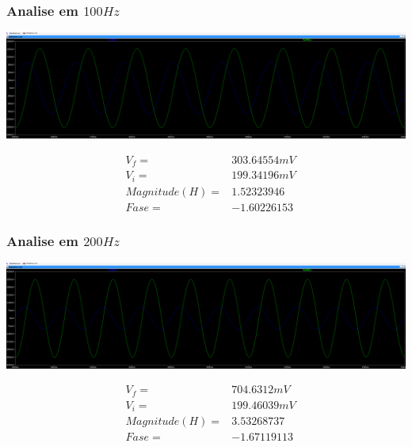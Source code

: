 \documentclass[12pt,twoside, a4paper, twocolumn]{article}
\begin{document}
\subsubsection{Analise em $100Hz$}

\begin{adjustbox}{scale=0.09}
    \includegraphics{ltfreq100.png}
\end{adjustbox}

\begin{equation*}
    \begin{aligned}
         & V_f =          & 303.64554mV \\
         & V_i =          & 199.34196mV \\
         & Magnitude(H) = & 1.52323946  \\
         & Fase =         & -1.60226153
    \end{aligned}
\end{equation*}


\subsubsection{Analise em $200Hz$}

\begin{adjustbox}{scale=0.09}
    \includegraphics{ltfreq200.png}
\end{adjustbox}

\begin{equation*}
    \begin{aligned}
         & V_f =          & 704.6312mV  \\
         & V_i =          & 199.46039mV \\
         & Magnitude(H) = & 3.53268737  \\
         & Fase =         & -1.67119113
    \end{aligned}
\end{equation*}
\end{document}

